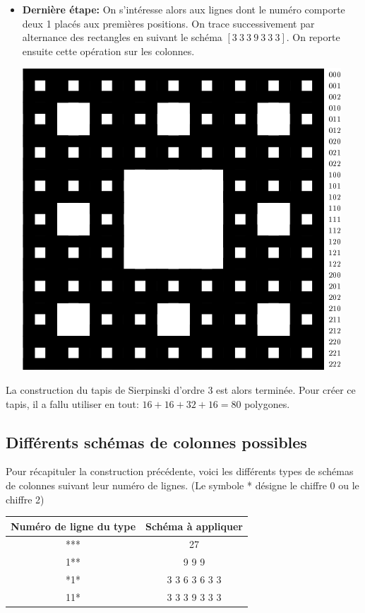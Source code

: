 \begin{itemize}
\begin{center}
\end{center}
\item [\textbullet] \textbf{Dernière étape:} On s'intéresse alors aux lignes dont le numéro comporte deux 1 placés aux premières positions. On trace successivement par alternance des rectangles en suivant le schéma $[3\ 3\ 3\ 9\ 3\ 3\ 3]$. On reporte ensuite cette opération sur les colonnes.
\begin{center}
\includegraphics{images/menger-schema06.png}
\end{center}
\end{itemize}
La construction du tapis de Sierpinski d'ordre 3 est alors terminée. Pour créer ce tapis, il a fallu utiliser en tout: $16+16+32+16=80$ polygones.
\subsection{Différents schémas de colonnes possibles}
Pour récapituler la construction précédente, voici les différents types de schémas de colonnes suivant leur numéro de lignes. (Le symbole * désigne le chiffre 0 ou le chiffre 2)
\begin{center}
 \begin{tabular}{|c|c|}
 \hline
Numéro de ligne du type & Schéma à appliquer \\
\hline
*** & 27 \\ 
\hline
1** &  9 9 9 \\
\hline
*1* & 3 3 6 3 6 3 3\\
\hline
11* & 3 3 3 9 3 3 3\\
\hline
\end{tabular}
\end{center}

